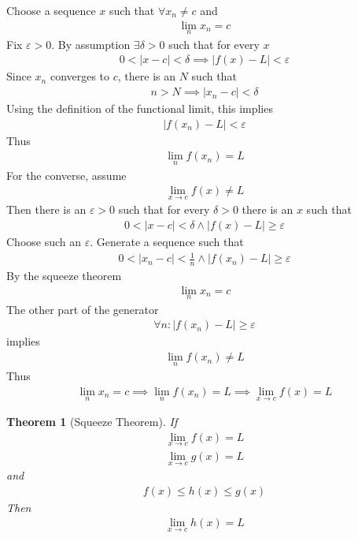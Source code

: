 \documentclass{amsart}
\numberwithin{equation}{section}
\let\oldendproof\endproof
\renewenvironment{proof}[1][\proofname]{%
  \setcounter{case}{0}
  \setcounter{step}{0}
  \oldproof[#1]%
}{\oldendproof}
\theoremstyle{plain}
\newtheorem{theorem}{Theorem}[section]
\theoremstyle{definition}
\theoremstyle{remark}
\begin{document}
\begin{proof}
  Choose a sequence $x$ such that $\forall x_n\neq c$ and
  \begin{align}
    \lim_n x_n = c
  \end{align}
  Fix $\varepsilon > 0$. By assumption $\exists \delta>0$ such that for every $x$
  \begin{align}
    0 < |x-c | < \delta \implies |f(x) - L| < \varepsilon
  \end{align}
  Since $x_n$ converges to $c$, there is an $N$ such that
  \begin{align}
    n> N \implies |x_n - c| < \delta
  \end{align}
  Using the definition of the functional limit, this implies
  \begin{align}
    |f(x_n) - L | < \varepsilon
  \end{align}
  Thus
  \begin{align}
    \lim_n f(x_n) = L
  \end{align}
  For the converse, assume
  \begin{align}
    \lim_{x\to c} f(x) \neq L
  \end{align}
  Then there is an $\varepsilon >0$ such that for every $\delta>0$ there is an $x$ such that
  \begin{align}
    0< |x-c| < \delta \land |f(x) - L| \geq \varepsilon
  \end{align}
  Choose such an $\varepsilon$. Generate a sequence such that
  \begin{align}
    0< |x_n-c| < \frac{1}{n} \land |f(x_n) - L| \geq \varepsilon
  \end{align}
  By the squeeze theorem
  \begin{align}
    \lim_n x_n = c
  \end{align}
  The other part of the generator
  \begin{align}
    \forall n: |f(x_n) - L | \geq \varepsilon
  \end{align}
  implies
  \begin{align}
    \lim_n f(x_n) \neq L
  \end{align}
  Thus
  \begin{align}
    \lim_n x_n = c \implies \lim_n f(x_n) =L \implies \lim_{x\to c} f(x) =L
  \end{align}
\end{proof}

\begin{theorem}[Squeeze Theorem]
  If
  \begin{align}
    \lim_{x\to c} f(x) = L\\
    \lim_{x\to c} g(x) = L
  \end{align}
  and
  \begin{align}
    f(x) \leq h(x) \leq g(x)
  \end{align}
  Then
  \begin{align}
    \lim_{x\to c} h(x) = L
  \end{align}
\end{theorem}
\end{document}
